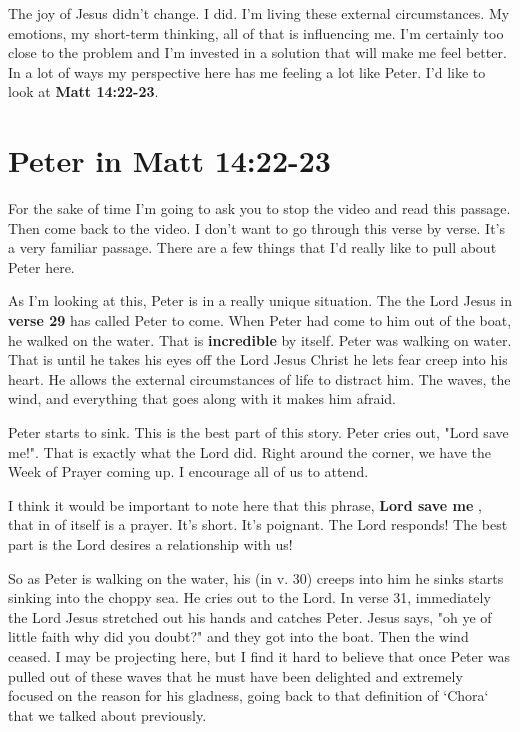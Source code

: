 \documentclass[11pt]{article} %
\begin{document}
The joy of Jesus didn't change. I did. I'm living these external circumstances. My emotions, my
short-term thinking, all of that is influencing me. I'm certainly too close to the problem and I'm
invested in a solution that will make me feel better. In a lot of ways my perspective here has me
feeling a lot like Peter. I'd like to look at \textbf{Matt 14:22-23}.

\section{Peter in Matt 14:22-23}

For the sake of time I'm going to ask you to stop the video and read this passage. Then come
back to the video. I don't want to go through this verse by verse. It's a very familiar passage.
There are a few things that I'd really like to pull about Peter here.

As I'm looking at this, Peter is in a really unique situation. The the Lord Jesus in \textbf{verse 29}
has called Peter to come. When Peter had come to him out of the boat, he walked on the water.
That is \textbf{incredible} by itself. Peter was walking on water. That is until he takes his eyes
off the Lord Jesus Christ he lets fear creep into his heart.  He allows the external circumstances
of life to distract him. The waves, the wind, and everything that goes along with it makes him
afraid.

Peter starts to sink. This is the best part of this story. Peter cries out, "Lord save me!". That is
exactly what the Lord did. Right around the corner, we have the Week of Prayer coming up.
I encourage all of us to attend.

I think it would be important to note here that this phrase,
\textbf{Lord save me} , that in of itself is a prayer. It's short. It's poignant.
The Lord responds! The best part is the Lord desires a relationship with us!

So as Peter is walking on the water, his (in v. 30) creeps into him he sinks starts sinking into
the choppy sea. He cries out to the Lord. In verse 31, immediately the Lord Jesus stretched
out his hands and catches Peter. Jesus says, "oh ye of little faith why did you doubt?" and
they got into the boat. Then the wind ceased. I may be projecting here, but I find it hard
to believe that once Peter was pulled out of these waves that he must have been delighted
and extremely focused on the reason for his gladness, going back to that definition of `Chora`
that we talked about previously.
\end{document}

